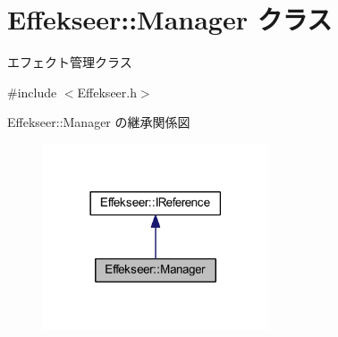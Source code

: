 \hypertarget{class_effekseer_1_1_manager}{}\section{Effekseer\+:\+:Manager クラス}
\label{class_effekseer_1_1_manager}


エフェクト管理クラス  




{\ttfamily \#include $<$Effekseer.\+h$>$}



Effekseer\+:\+:Manager の継承関係図\nopagebreak
\begin{figure}[H]
\begin{center}
\leavevmode
\includegraphics[width=189pt]{class_effekseer_1_1_manager__inherit__graph}
\end{center}
\end{figure}
